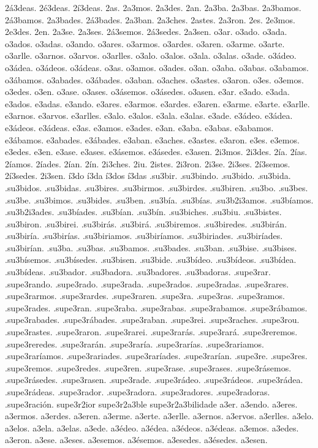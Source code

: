 {2á3deas. 2é3deas. 2í3deas.
%
2as. 2a3mos. 2a3des. 2an.
2a3ba. 2a3bas. 2a3bamos. 2á3bamos. 2a3bades. 2á3bades. 2a3ban.
2a3ches. 2astes. 2a3ron.
2es. 2e3mos. 2e3des. 2en.
2a3se. 2a3ses. 2á3semos. 2á3sedes. 2a3sen.
%
o3ar. o3ado. o3ada. o3ados. o3adas. o3ando.
o3ares. o3armos. o3ardes. o3aren.
o3arme. o3arte. o3arlle. o3arnos. o3arvos. o3arlles.
o3alo. o3alos. o3ala. o3alas.
o3ade. o3ádeo. o3ádea. o3ádeos. o3ádeas.
o3as. o3amos. o3ades. o3an.
o3aba. o3abas. o3abamos. o3ábamos. o3abades. o3ábades. o3aban.
o3aches. o3astes. o3aron.
o3es. o3emos. o3edes. o3en.
o3ase. o3ases. o3ásemos. o3ásedes. o3asen.
%
e3ar. e3ado. e3ada. e3ados. e3adas. e3ando.
e3ares. e3armos. e3ardes. e3aren.
e3arme. e3arte. e3arlle. e3arnos. e3arvos. e3arlles.
e3alo. e3alos. e3ala. e3alas.
e3ade. e3ádeo. e3ádea. e3ádeos. e3ádeas.
e3as. e3amos. e3ades. e3an.
e3aba. e3abas. e3abamos. e3ábamos. e3abades. e3ábades. e3aban.
e3aches. e3astes. e3aron.
e3es. e3emos. e3edes. e3en.
e3ase. e3ases. e3ásemos. e3ásedes. e3asen.
%
2i3mos. 2i3des.
2ía. 2ías. 2íamos. 2íades. 2ían.
2ín. 2i3ches. 2iu. 2istes. 2i3ron.
2i3se. 2i3ses. 2í3semos. 2í3sedes. 2i3sen.
%
í3do í3da í3dos í3das
%
.su3bir. .su3bindo. .su3bido. .su3bida. .su3bidos. .su3bidas.
.su3bires. .su3birmos. .su3birdes. .su3biren.
.su3bo. .su3bes. .su3be. .su3bimos. .su3bides. .su3ben.
.su3bía. .su3bías. .su3b2i3amos. .su3bíamos. .su3b2i3ades. .su3bíades. .su3bían.
.su3bín. .su3biches. .su3biu. .su3bistes. .su3biron.
.su3birei. .su3birás. .su3birá. .su3biremos. .su3biredes. .su3birán.
.su3biría. .su3birías. .su3biriamos. .su3biríamos. .su3biriades. .su3biríades. .su3birían.
.su3ba. .su3bas. .su3bamos. .su3bades. .su3ban.
.su3bise. .su3bises. .su3bísemos. .su3bísedes. .su3bisen.
.su3bide. .su3bídeo. .su3bídeos. .su3bídea. .su3bídeas.
.su3bador. .su3badora. .su3badores. .su3badoras.
%
.supe3rar. .supe3rando. .supe3rado. .supe3rada. .supe3rados. .supe3radas.
.supe3rares. .supe3rarmos. .supe3rardes. .supe3raren.
.supe3ra. .supe3ras. .supe3ramos. .supe3rades. .supe3ran.
.supe3raba. .supe3rabas. .supe3rabamos. .supe3rábamos. .supe3rabades. .supe3rábades. .supe3raban.
.supe3rei. .supe3raches. .supe3rou. .supe3rastes. .supe3raron.
.supe3rarei. .supe3rarás. .supe3rará. .supe3reremos. .supe3reredes. .supe3rarán.
.supe3raría. .supe3rarías. .supe3rariamos. .supe3raríamos. .supe3rariades. .supe3raríades. .supe3rarían.
.supe3re. .supe3res. .supe3remos. .supe3redes. .supe3ren.
.supe3rase. .supe3rases. .supe3rásemos. .supe3rásedes. .supe3rasen.
.supe3rade. .supe3rádeo. .supe3rádeos. .supe3rádea. .supe3rádeas.
.supe3rador. .supe3radora. .supe3radores. .supe3radoras. .supe3ración.
supe3r2ior supe3r2a3ble supe3r2a3bilidade
%
a3er. a3endo.
a3eres. a3ermos. a3erdes. a3eren.
a3erme. a3erte. a3erlle. a3ernos. a3ervos. a3erlles.
a3elo. a3elos. a3ela. a3elas.
a3ede. a3édeo. a3édea. a3édeos. a3édeas.
a3emos. a3edes. a3eron.
a3ese. a3eses. a3esemos. a3ésemos. a3esedes. a3ésedes. a3esen.
}
